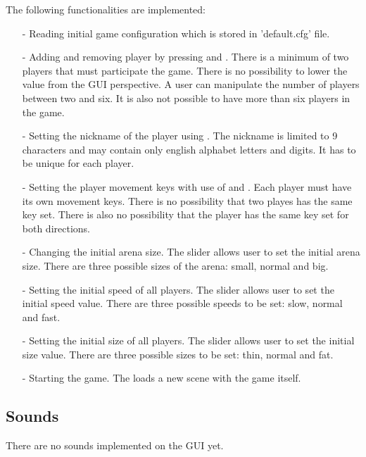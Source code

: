 \noindent The following functionalities are implemented:

\begin{itemize}
	\item[-] Reading initial game configuration which is stored in 'default.cfg' file.
	\item[-] Adding and removing player by pressing  and . There is a minimum of two players that must participate the game. There is no possibility  to lower the value from the GUI perspective. A user can manipulate the number of players between two and six. It is also not possible to have more than six players in the game.
	\item[-] Setting the nickname of the player using . The nickname is limited to 9 characters and may contain only english alphabet letters and digits. It has to be unique for each player.
	\item[-] Setting the player movement keys with use of  and . Each player must have its own movement keys. There is no possibility that two playes has the same key set. There is also no possibility that the player has the same key set for both directions.
	\item[-] Changing the initial arena size. The  slider allows user to set the initial arena size. There are three possible sizes of the arena: small, normal and big.
	\item[-] Setting the initial speed of all players. The  slider allows user to set the initial speed value. There are three possible speeds to be set: slow, normal and fast.
	\item[-] Setting the initial size of all players. The  slider allows user to set the initial size value. There are three possible sizes to be set: thin, normal and fat.
	\item[-] Starting the game. The  loads a new scene with the game itself.
\end{itemize} 

\subsection{Sounds}
\indent There are no sounds implemented on the GUI yet.